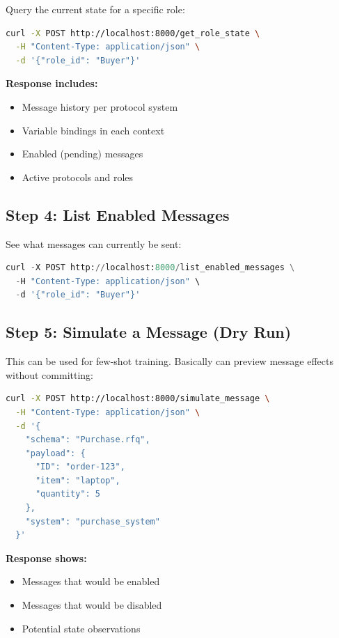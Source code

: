 \documentclass[11pt,a4paper]{article}
\begin{document}
Query the current state for a specific role:

\begin{lstlisting}[language=bash]
curl -X POST http://localhost:8000/get_role_state \
  -H "Content-Type: application/json" \
  -d '{"role_id": "Buyer"}'
\end{lstlisting}

\textbf{Response includes:}
\begin{itemize}
    \item Message history per protocol system
    \item Variable bindings in each context
    \item Enabled (pending) messages
    \item Active protocols and roles
\end{itemize}

\subsection{Step 4: List Enabled Messages}

See what messages can currently be sent:

\begin{lstlisting}[language=python]
curl -X POST http://localhost:8000/list_enabled_messages \
  -H "Content-Type: application/json" \
  -d '{"role_id": "Buyer"}'
\end{lstlisting}

\subsection{Step 5: Simulate a Message (Dry Run)}

This can be used for few-shot training. Basically can preview message effects without committing:

\begin{lstlisting}[language=bash,showspaces=false]
curl -X POST http://localhost:8000/simulate_message \
  -H "Content-Type: application/json" \
  -d '{
    "schema": "Purchase.rfq",
    "payload": {
      "ID": "order-123",
      "item": "laptop",
      "quantity": 5
    },
    "system": "purchase_system"
  }'
\end{lstlisting}

\textbf{Response shows:}
\begin{itemize}
    \item Messages that would be enabled
    \item Messages that would be disabled
    \item Potential state observations
\end{itemize}
\end{document}
